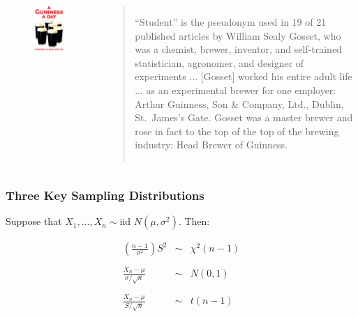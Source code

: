 \documentclass[handout]{beamer}
\begin{document}
\begin{frame}
\begin{columns}
\begin{figure}
\includegraphics[scale = 0.17]{./images/guinness}
\end{figure}


\footnotesize
\begin{quote}
``Student'' is the pseudonym used in 19 of 21 published articles by William Sealy
Gosset, who was a chemist, brewer, inventor, and self-trained statistician, agronomer, and designer of experiments ... [Gosset] worked his entire adult life ... as an experimental brewer for one employer: Arthur Guinness, Son \& Company, Ltd., Dublin, St.\ James’s Gate. Gosset was a master brewer and rose in fact to the top of the top of the brewing industry: Head Brewer of Guinness.
\end{quote}

\end{columns}

\end{frame}



\begin{frame}
\frametitle{Three Key Sampling Distributions}
Suppose that $X_1, \hdots, X_n \sim \mbox{iid } N(\mu,\sigma^2)$. Then:

	\begin{eqnarray*}
		\left(\frac{n-1}{\sigma^2}\right) S^2&\sim&\chi^2(n-1)\\ \\
		\frac{\bar{X}_n-\mu}{\sigma/\sqrt{n}}&\sim& N(0,1)\\ \\
		\frac{\bar{X}_n-\mu}{S/\sqrt{n}}&\sim&t(n-1)
	\end{eqnarray*}
\end{frame}
\end{document}
